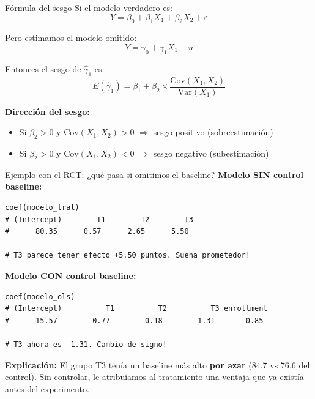 \documentclass[aspectratio=169, 11pt]{beamer}
\begin{document}
\begin{frame}{Fórmula del sesgo}
Si el modelo verdadero es:
\[
Y = \beta_0 + \beta_1 X_1 + \beta_2 X_2 + \varepsilon
\]

Pero estimamos el modelo omitido:
\[
Y = \gamma_0 + \gamma_1 X_1 + u
\]

Entonces el sesgo de $\hat{\gamma}_1$ es:
\[
E(\hat{\gamma}_1) = \beta_1 + \beta_2 \times \frac{\text{Cov}(X_1, X_2)}{\text{Var}(X_1)}
\]

\vspace{0.2cm}
\textbf{Dirección del sesgo:}
\begin{itemize}
  \item Si $\beta_2 > 0$ y $\text{Cov}(X_1, X_2) > 0$ $\Rightarrow$ sesgo positivo (sobreestimación)
  \item Si $\beta_2 > 0$ y $\text{Cov}(X_1, X_2) < 0$ $\Rightarrow$ sesgo negativo (subestimación)
\end{itemize}
\end{frame}

\begin{frame}[fragile]{Ejemplo con el RCT: ¿qué pasa si omitimos el baseline?}
\textbf{Modelo SIN control baseline:}
\begin{lstlisting}[basicstyle=\ttfamily\scriptsize]
coef(modelo_trat)
# (Intercept)        T1        T2        T3
#      80.35      0.57      2.65      5.50

# T3 parece tener efecto +5.50 puntos. Suena prometedor!
\end{lstlisting}

\vspace{0.2cm}
\textbf{Modelo CON control baseline:}
\begin{lstlisting}[basicstyle=\ttfamily\scriptsize]
coef(modelo_ols)
# (Intercept)          T1          T2          T3 enrollment
#      15.57       -0.77       -0.18       -1.31       0.85

# T3 ahora es -1.31. Cambio de signo!
\end{lstlisting}

\vspace{0.2cm}
{\small \textbf{Explicación:} El grupo T3 tenía un baseline más alto \textbf{por azar} (84.7 vs 76.6 del control). Sin controlar, le atribuíamos al tratamiento una ventaja que ya existía antes del experimento.}
\end{frame}
\end{document}
